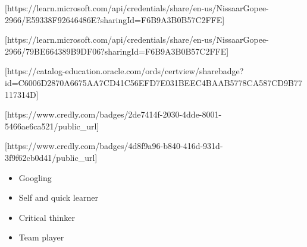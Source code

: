 \documentclass[10pt,a4paper,ragged2e,withhyper]{altacv}
\begin{document}
\begin{paracol}{2}

[https://learn.microsoft.com/api/credentials/share/en-us/NissaarGopee-2966/E59338F92646486E?sharingId=F6B9A3B0B57C2FFE]

\divider


[https://learn.microsoft.com/api/credentials/share/en-us/NissaarGopee-2966/79BE664389B9DF06?sharingId=F6B9A3B0B57C2FFE]

\divider


[https://catalog-education.oracle.com/ords/certview/sharebadge?id=C6006D2870A6675AA7CD41C56EFD7E031BEEC4BAAB5778CA587CD9B77117314D]

\divider


[https://www.credly.com/badges/2de7414f-2030-4dde-8001-5466ae6ca521/public_url]

\divider


[https://www.credly.com/badges/4d8f9a96-b840-416d-931d-3f9f62cb0d41/public_url]

\newpage



\begin{multicols}{2}
\begin{itemize}[label=\textcolor{DarkPastelRed}{$\triangleright$}]
\item Googling
\item Self and quick learner
\item Critical thinker
\item Team player 
\end{itemize}
\end{multicols}




\end{paracol}
\end{document}

